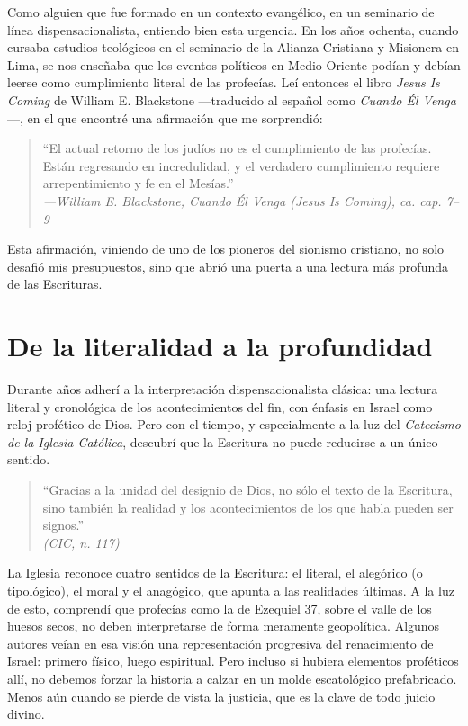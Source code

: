 \documentclass[12pt]{article}
\begin{document}
Como alguien que fue formado en un contexto evangélico, en un seminario de línea dispensacionalista, entiendo bien esta urgencia. En los años ochenta, cuando cursaba estudios teológicos en el seminario de la Alianza Cristiana y Misionera en Lima, se nos enseñaba que los eventos políticos en Medio Oriente podían y debían leerse como cumplimiento literal de las profecías. Leí entonces el libro \emph{Jesus Is Coming} de William E. Blackstone —traducido al español como \emph{Cuando Él Venga}—, en el que encontré una afirmación que me sorprendió:

\begin{quote}
“El actual retorno de los judíos no es el cumplimiento de las profecías. Están regresando en incredulidad, y el verdadero cumplimiento requiere arrepentimiento y fe en el Mesías.” \\ \emph{—William E. Blackstone, \textnormal{\emph{Cuando Él Venga (Jesus Is Coming)}, ca. cap. 7–9}}
\end{quote}

Esta afirmación, viniendo de uno de los pioneros del sionismo cristiano, no solo desafió mis presupuestos, sino que abrió una puerta a una lectura más profunda de las Escrituras.

\section*{De la literalidad a la profundidad}
Durante años adherí a la interpretación dispensacionalista clásica: una lectura literal y cronológica de los acontecimientos del fin, con énfasis en Israel como reloj profético de Dios. Pero con el tiempo, y especialmente a la luz del \emph{Catecismo de la Iglesia Católica}, descubrí que la Escritura no puede reducirse a un único sentido.

\begin{quote}
“Gracias a la unidad del designio de Dios, no sólo el texto de la Escritura, sino también la realidad y los acontecimientos de los que habla pueden ser signos.” \\ \emph{(CIC, n. 117)}
\end{quote}

La Iglesia reconoce cuatro sentidos de la Escritura: el literal, el alegórico (o tipológico), el moral y el anagógico, que apunta a las realidades últimas. A la luz de esto, comprendí que profecías como la de Ezequiel 37, sobre el valle de los huesos secos, no deben interpretarse de forma meramente geopolítica. Algunos autores veían en esa visión una representación progresiva del renacimiento de Israel: primero físico, luego espiritual. Pero incluso si hubiera elementos proféticos allí, no debemos forzar la historia a calzar en un molde escatológico prefabricado. Menos aún cuando se pierde de vista la justicia, que es la clave de todo juicio divino.
\end{document}
